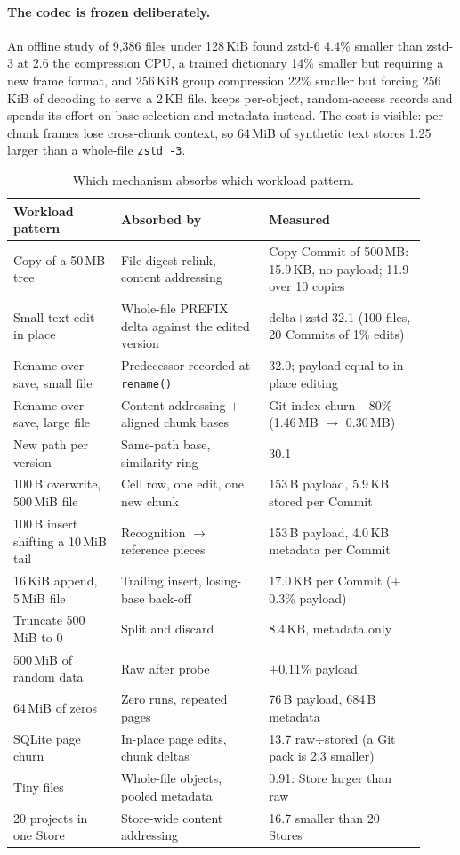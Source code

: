 \paragraph{The codec is frozen deliberately.} An offline study of 9,386 files under
128\,KiB found zstd-6 4.4\% smaller than zstd-3 at 2.6\X{} the compression CPU, a
trained dictionary 14\% smaller but requiring a new frame format, and 256\,KiB group
compression 22\% smaller but forcing 256\,KiB of decoding to serve a 2\,KB file.
\sys{} keeps per-object, random-access records and spends its effort on base selection
and metadata instead. The cost is visible: per-chunk frames lose cross-chunk context, so
64\,MiB of synthetic text stores 1.25\X{} larger than a whole-file \texttt{zstd -3}.

\begin{table}[h]
\centering
\small
\begin{tabular}{p{0.24\linewidth} p{0.33\linewidth} p{0.35\linewidth}}
\toprule
Workload pattern & Absorbed by & Measured \\
\midrule
Copy of a 50\,MB tree & File-digest relink, content addressing & Copy Commit of 500\,MB: 15.9\,KB, no payload; 11.9\X{} over 10 copies \\
Small text edit in place & Whole-file PREFIX delta against the edited version & delta$+$zstd 32.1\X{} (100 files, 20 Commits of 1\% edits) \\
Rename-over save, small file & Predecessor recorded at \texttt{rename()} & 32.0\X{}; payload equal to in-place editing \\
Rename-over save, large file & Content addressing $+$ aligned chunk bases & Git index churn $-$80\% (1.46\,MB $\rightarrow$ 0.30\,MB) \\
New path per version & Same-path base, similarity ring & 30.1\X{} \\
100\,B overwrite, 500\,MiB file & Cell row, one edit, one new chunk & 153\,B payload, 5.9\,KB stored per Commit \\
100\,B insert shifting a 10\,MiB tail & Recognition $\rightarrow$ reference pieces & 153\,B payload, 4.0\,KB metadata per Commit \\
16\,KiB append, 5\,MiB file & Trailing insert, losing-base back-off & 17.0\,KB per Commit ($+$0.3\% payload) \\
Truncate 500\,MiB to 0 & Split and discard & 8.4\,KB, metadata only \\
500\,MiB of random data & Raw after probe & $+$0.11\% payload \\
64\,MiB of zeros & Zero runs, repeated pages & 76\,B payload, 684\,B metadata \\
SQLite page churn & In-place page edits, chunk deltas & 13.7\X{} raw$\div$stored (a Git pack is 2.3\X{} smaller) \\
Tiny files & Whole-file objects, pooled metadata & 0.91\X{}: Store larger than raw \\
20 projects in one Store & Store-wide content addressing & 16.7\X{} smaller than 20 Stores \\
\bottomrule
\end{tabular}
\caption{Which mechanism absorbs which workload pattern.}
\label{tab:patterns}
\end{table}

